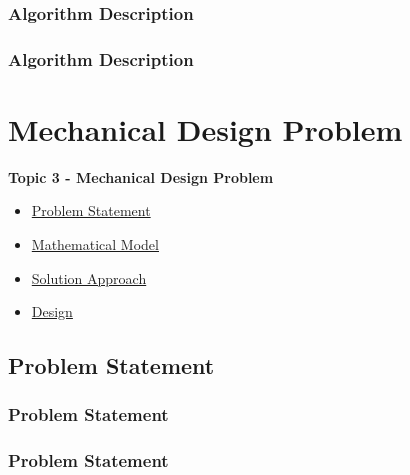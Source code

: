 \documentclass[fleqn]{beamer} %
\newcommand{\sectionIVtitle}{Mechanical Design Problem}
\newcommand{\sectionIIIsubsectionIIItitle}{Algorithm Description}
\newcommand{\sectionIVsubsectionItitle}{Problem Statement}
\newcommand{\sectionIVsubsectionIItitle}{Mathematical Model}
\newcommand{\sectionIVsubsectionIIItitle}{Solution Approach}
\newcommand{\sectionIVsubsectionIVtitle}{Design}
\begin{document}
			\begin{frame}
				\frametitle{\sectionIIIsubsectionIIItitle}
				\bigskip
				
				\btVFill
			\end{frame}

			\begin{frame}
				\frametitle{\sectionIIIsubsectionIIItitle}
				\bigskip
				
				\btVFill
			\end{frame}


	\section{\sectionIVtitle}\label{sectionIV}

		\begin{frame}
			\large \textbf{Topic 3 - \sectionIVtitle} \vspace{3mm}\\

			\begin{itemize}
				\item \hyperlink{sectionIVsubsectionI}{\sectionIVsubsectionItitle} \vspc %
				\item \hyperlink{sectionIVsubsectionII}{\sectionIVsubsectionIItitle} \vspc %
				\item \hyperlink{sectionIVsubsectionIII}{\sectionIVsubsectionIIItitle} \vspc %
				\item \hyperlink{sectionIVsubsectionIV}{\sectionIVsubsectionIVtitle} \vspc %
			\end{itemize}

		\end{frame}

		\subsection{\sectionIVsubsectionItitle}\label{sectionIVsubsectionI}

			\begin{frame}
				\frametitle{\sectionIVsubsectionItitle}
				\bigskip
					
				\btVFill
			\end{frame}

			\begin{frame}
				\frametitle{\sectionIVsubsectionItitle}
				\bigskip

				\btVFill
			\end{frame}
\end{document}
